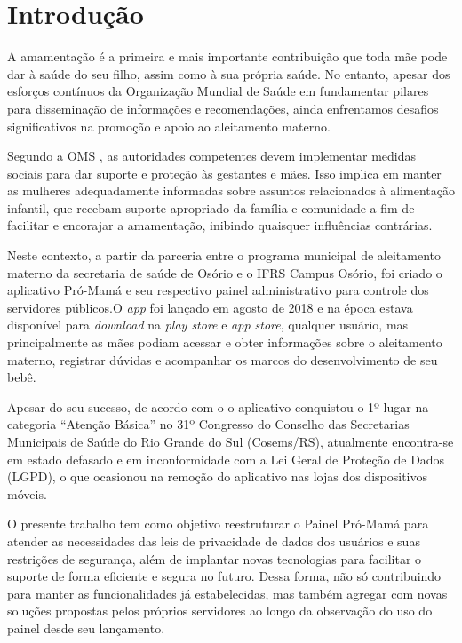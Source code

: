 \chapter{Introdução}

A amamentação é a primeira e mais importante contribuição que toda mãe pode dar à saúde do seu filho, assim como à sua própria saúde. No entanto, apesar dos esforços contínuos da Organização Mundial de Saúde em fundamentar pilares para disseminação de informações e recomendações, ainda enfrentamos desafios significativos na promoção e apoio ao aleitamento materno.

Segundo a OMS , as autoridades competentes devem implementar medidas sociais para dar suporte e proteção às gestantes e mães. Isso implica em manter as mulheres adequadamente informadas sobre assuntos relacionados à alimentação infantil, que recebam suporte apropriado da família e comunidade a fim de facilitar e encorajar a amamentação, inibindo quaisquer influências contrárias.

Neste contexto, a partir da parceria entre o programa municipal de aleitamento materno da secretaria de saúde de Osório e o IFRS Campus Osório, foi criado o aplicativo Pró-Mamá e seu respectivo painel administrativo para controle dos servidores públicos.O \emph{app} foi lançado em agosto de 2018 e na época estava disponível para \emph{download} na \emph{play store} e \emph{app store}, qualquer usuário, mas principalmente as mães podiam acessar e obter informações sobre o aleitamento materno, registrar dúvidas e acompanhar os marcos do desenvolvimento de seu bebê.

Apesar do seu sucesso, de acordo com o  o aplicativo conquistou o 1º lugar na categoria “Atenção Básica” no 31º Congresso do Conselho das Secretarias Municipais de Saúde do Rio Grande do Sul (Cosems/RS), atualmente encontra-se em estado defasado e em inconformidade com a Lei Geral de Proteção de Dados (LGPD), o que ocasionou na remoção do aplicativo nas lojas dos dispositivos móveis.

O presente trabalho tem como objetivo reestruturar o Painel Pró-Mamá para atender as necessidades das leis de privacidade de dados dos usuários e suas restrições de segurança, além de implantar novas tecnologias para facilitar o suporte de forma eficiente e segura no futuro. Dessa forma, não só contribuindo para manter as funcionalidades já estabelecidas, mas também agregar com novas soluções propostas pelos próprios servidores ao longo da observação do uso do painel desde seu lançamento.

